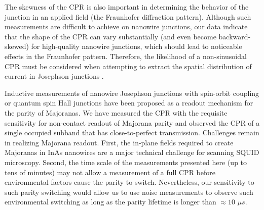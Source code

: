 \documentclass[11pt]{article}
\begin{document}
The skewness of the CPR is also important in determining the behavior of the junction in an applied field (the Fraunhofer diffraction pattern). Although such measurements are difficult to achieve on nanowire junctions, our data indicate that the shape of the CPR can vary substantially (and even become backward-skewed) for high-quality nanowire junctions, which should lead to noticeable effects in the Fraunhofer pattern. Therefore, the likelihood of a non-sinusoidal CPR must be considered when attempting to extract the spatial distribution of current in Josephson junctions .

Inductive measurements of nanowire Josephson junctions with spin-orbit coupling  or quantum spin Hall junctions  have been proposed as a readout mechanism for the parity of Majoranas. We have measured the CPR with the requisite sensitivity for non-contact readout of Majorana parity and observed the CPR of a single occupied subband that has close-to-perfect transmission. Challenges remain in realizing Majorana readout. First, the in-plane fields required to create Majoranas in InAs nanowires are a major technical challenge for scanning SQUID microscopy. Second, the time scale of the measurements presented here (up to tens of minutes) may not allow a measurement of a full CPR before environmental factors cause the parity to switch. Nevertheless, our sensitivity to such parity switching would allow us to use noise measurements to observe such environmental switching as long as the parity lifetime is longer than  $\approx10$ $\mu s$.
\end{document}
